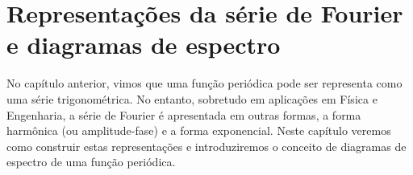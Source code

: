 \chapter{Representações da série de Fourier e diagramas de espectro}
No capítulo anterior, vimos que uma função periódica pode ser representa como uma série trigonométrica. No entanto, sobretudo em aplicações em Física e Engenharia, a série de Fourier é apresentada em outras formas, a forma harmônica (ou amplitude-fase) e a forma exponencial. Neste capítulo veremos como construir estas representações e introduziremos o conceito de diagramas de espectro de uma função periódica.
